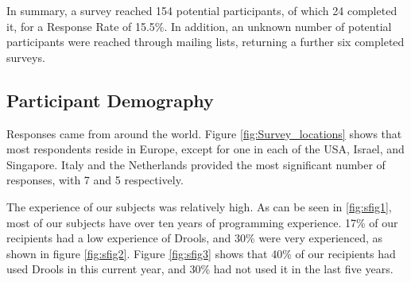 In summary, a survey reached 154 potential participants, of which 24 completed it, for a Response Rate of 15.5\%.
In addition, an unknown number of potential participants were reached through mailing lists, returning a further six completed surveys.

\subsection{Participant Demography}

Responses came from around the world.
Figure \ref{fig:Survey_locations} shows that most respondents reside in Europe, except for one in each of the USA, Israel, and Singapore. 
Italy and the Netherlands provided the most significant number of responses, with 7 and 5 respectively.

The experience of our subjects was relatively high.
As can be seen in \ref{fig:sfig1}, most of our subjects have over ten years of programming experience.
17\% of our recipients had a low experience of Drools, and 30\% were very experienced, as shown in figure \ref{fig:sfig2}.
Figure \ref{fig:sfig3} shows that 40\% of our recipients had used Drools in this current year, and 30\% had not used it in the last five years.

